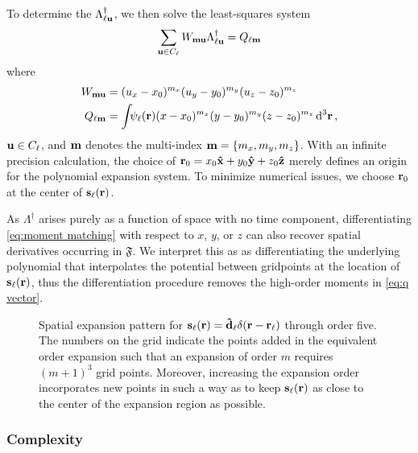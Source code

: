 To determine the $\Lambda_{\ell \vb{u}}^\dagger$, we then solve the least-squares system
\begin{equation}
  \sum_{\vb{u} \in C_\ell} W_{\vb{m}\vb{u}}\Lambda_{\ell\vb{u}}^\dagger = Q_{\ell\vb{m}}
  \label{eq:expansion matrix system}
\end{equation}
where
\begin{subequations}
  \begin{align}
    W_{\vb{m}\vb{u}} &= (u_x - x_0)^{m_x} (u_y - y_0)^{m_y} (u_z - z_0)^{m_z} \label{eq:w matrix} \\
    Q_{\ell \vb{m}} &= \int_{} \psi_\ell(\vb{r}) (x - x_0)^{m_x} (y - y_0)^{m_y} (z - z_0)^{m_z} \dd[3]{\vb{r}} \label{eq:q vector},
  \end{align}
\end{subequations}
$\vb{u} \in C_\ell$, and $\vb{m}$ denotes the multi-index $\vb{m} = \qty{m_x, m_y, m_z}$.
With an infinite precision calculation, the choice of $\vb{r}_0 = x_0 \vu{x} + y_0 \vu{y} + z_0 \vu{z}$ merely defines an origin for the polynomial expansion system.
To minimize numerical issues, we choose $\vb{r}_0$ at the center of $\vb{s}_\ell(\vb{r})$.

As $\Lambda^\dagger$ arises purely as a function of space with no time component, differentiating \cref{eq:moment matching} with respect to $x$, $y$, or $z$ can also recover spatial derivatives occurring in $\mathfrak{F}$.
We interpret this as as differentiating the underlying polynomial that interpolates the potential between gridpoints at the location of $\vb{s}_\ell(\vb{r})$, thus the differentiation procedure removes the high-order moments in \cref{eq:q vector}.

\begin{figure}
  \centering
  \caption{\label{fig:expansion pattern}Spatial expansion pattern for $\vb{s}_\ell(\vb{r}) = \vu{d}_\ell \delta(\vb{r} - \vb{r}_\ell)$ through order five.
    The numbers on the grid indicate the points added in the equivalent order expansion such that an expansion of order $m$ requires $(m + 1)^3$ grid points.
    Moreover, increasing the expansion order incorporates new points in such a way as to keep $\vb{s}_\ell(\vb{r})$ as close to the center of the expansion region as possible.
  }
\end{figure}

\subsubsection{Complexity}

